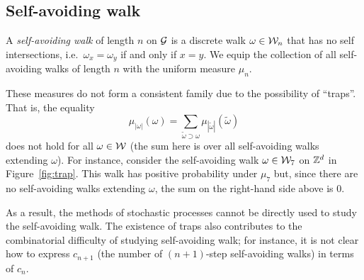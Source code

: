 \begin{example}
\end{example}


\subsection{Self-avoiding walk}

A \emph{self-avoiding walk} of length $n$ on $\mathcal{G}$ is a discrete walk $\omega\in\mathcal{W}_n$ that has no self intersections, i.e.\ $\omega_x = \omega_y$ if and only if $x = y$. We equip the collection of all self-avoiding walks of length $n$ with the uniform measure $\mu_n$.

These measures do not form a consistent family due to the possibility of ``traps''. That is, the equality
\begin{equation}
\mu_{|\omega|}(\omega) = \sum_{\tilde\omega \supset \omega} \mu_{|\tilde\omega|}(\tilde\omega)
\end{equation}
does not hold for all $\omega\in\mathcal{W}$ (the sum here is over all self-avoiding walks extending $\omega$).
For instance, consider the self-avoiding walk $\omega\in\mathcal{W}_7$ on ${ {{\mathbb Z}}^d }$ in
Figure~\ref{fig:trap}. This walk has positive probability under $\mu_7$ but,
since there are no self-avoiding walks extending $\omega$, the sum on the right-hand side above is $0$.

As a result, the methods of stochastic processes cannot be directly used to study the self-avoiding walk. The existence of traps also contributes to the combinatorial difficulty of studying self-avoiding walk; for instance, it is not clear how to express $c_{n+1}$ (the number of $(n+1)$-step self-avoiding walks) in terms of $c_n$.


